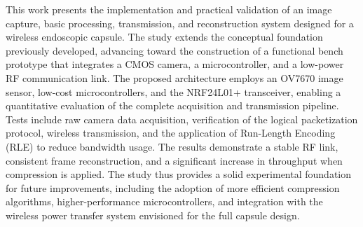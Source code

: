 \documentclass[repeatfields,xlists,xpacks,oneside]{ufrgscca}
\begin{document}
\begin{otherabstract}


This work presents the implementation and practical validation of an image capture, basic processing, transmission, and reconstruction system designed for a wireless endoscopic capsule. The study extends the conceptual foundation previously developed, advancing toward the construction of a functional bench prototype that integrates a CMOS camera, a microcontroller, and a low-power RF communication link. The proposed architecture employs an OV7670 image sensor, low-cost microcontrollers, and the NRF24L01+ transceiver, enabling a quantitative evaluation of the complete acquisition and transmission pipeline. Tests include raw camera data acquisition, verification of the logical packetization protocol, wireless transmission, and the application of Run-Length Encoding (RLE) to reduce bandwidth usage. The results demonstrate a stable RF link, consistent frame reconstruction, and a significant increase in throughput when compression is applied. The study thus provides a solid experimental foundation for future improvements, including the adoption of more efficient compression algorithms, higher-performance microcontrollers, and integration with the wireless power transfer system envisioned for the full capsule design.

\end{otherabstract}


\setcounter{tocdepth}{3}

\listoffigures

\listoftables

\end{document}
